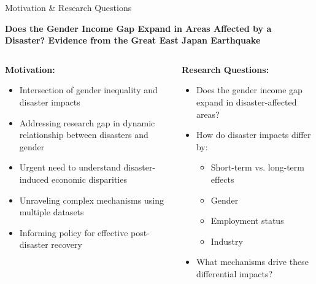 \documentclass[serif, aspectratio=169]{beamer}
\begin{document}
\begin{frame}{Motivation \& Research Questions}
    \begin{center}

\vspace{-0.30cm} 
    
        \Large\textbf{Does the Gender Income Gap Expand in Areas Affected by a Disaster? Evidence from the Great East Japan Earthquake}
        \vspace{-0.3cm}

    \end{center}
    \vspace{0.2cm}
    
    \begin{columns}[T]
        \begin{column}{0.5\textwidth}
            \textbf{Motivation:}
            \begin{itemize}\small
                \item Intersection of gender inequality and disaster impacts
                \item Addressing research gap in dynamic relationship between disasters and gender
                \item Urgent need to understand disaster-induced economic disparities
                \item Unraveling complex mechanisms using multiple datasets
                \item Informing policy for effective post-disaster recovery
            \end{itemize}
        \end{column}
        
        \begin{column}{0.5\textwidth}
            \textbf{Research Questions:}
            \begin{itemize}\small
                \item Does the gender income gap expand in disaster-affected areas?
                \item How do disaster impacts differ by:
                    \begin{itemize}\footnotesize
                        \item Short-term vs. long-term effects
                        \item Gender
                        \item Employment status
                        \item Industry
                    \end{itemize}
                \item What mechanisms drive these differential impacts?
            \end{itemize}
        \end{column}
    \end{columns}
\end{frame}
\end{document}
